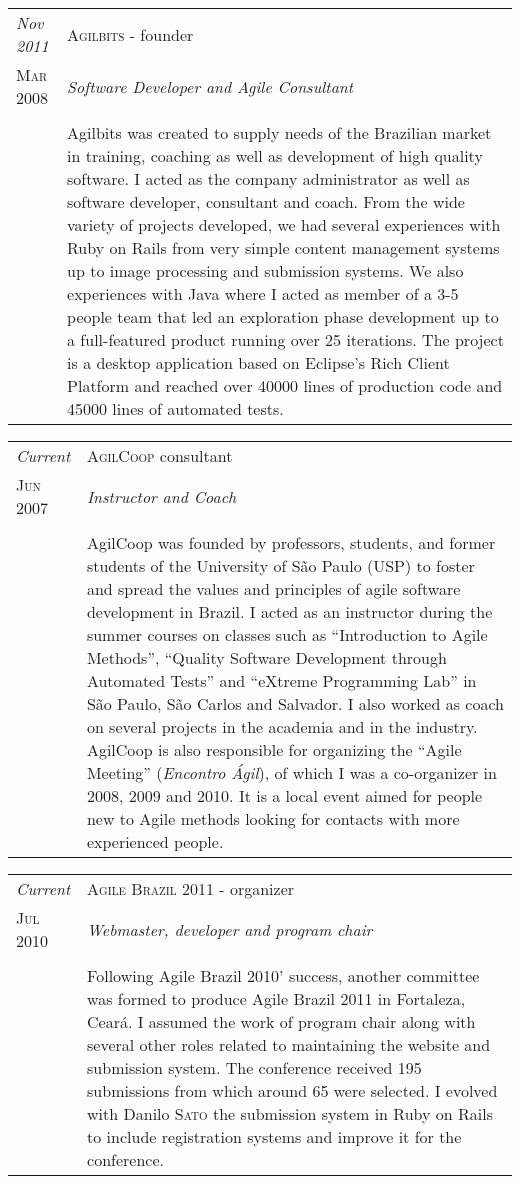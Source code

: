 \documentclass[letter,10pt]{article}
\begin{document}
\begin{tabular}{p{2.5cm}|p{13.5cm}}
  \emph{Nov 2011} & \textsc{Agilbits} - founder\\
  \textsc{Mar 2008}& \emph{Software Developer and Agile Consultant}\\
  &\\
  &Agilbits was created
  to supply needs of the Brazilian market in training, coaching as
  well as development of high quality software. I acted as the
  company administrator as well as software developer, consultant
  and coach.
  From the wide variety of projects developed, we had several
  experiences with Ruby on Rails from very simple content management
  systems up to image processing and submission systems.
  We also experiences with Java where I acted as member of a 3-5
  people team that led an exploration phase development up to a
  full-featured product running over 25 iterations. The project is a
  desktop application based on Eclipse's Rich Client Platform and
  reached over 40000 lines of production code and 45000 lines of
  automated tests.
\end{tabular}

\begin{tabular}{p{2.5cm}|p{13.5cm}}
  \emph{Current} & \textsc{AgilCoop} consultant\\
  \textsc{Jun 2007}& \emph{Instructor and Coach}\\
  &\\
  &AgilCoop was founded by professors,
  students, and former students of the University of São Paulo (USP)
  to foster and spread the values and principles of agile software
  development in Brazil. I acted as an instructor during the summer
  courses on classes such as ``Introduction to Agile Methods'',
  ``Quality Software Development through Automated Tests'' and
  ``eXtreme Programming Lab'' in São Paulo, São Carlos and Salvador.
  I also worked as coach on several projects in the academia
  and in the industry. AgilCoop is also responsible for organizing
  the ``Agile Meeting'' (\emph{Encontro Ágil}), of which I was a
  co-organizer in 2008, 2009 and 2010. It is a local
  event aimed for people new to Agile methods looking for contacts
  with more experienced people.
\end{tabular}

\begin{tabular}{p{2.5cm}|p{13.5cm}}
  \emph{Current} & \textsc{Agile Brazil 2011} - organizer\\
  \textsc{Jul 2010}& \emph{Webmaster, developer and program chair}\\
  &\\
  & Following Agile Brazil 2010' success, another committee was formed
  to produce Agile Brazil 2011 in Fortaleza, Ceará. I assumed the work
  of program chair along with several other roles related to
  maintaining the website and submission system. The conference
  received 195 submissions from which around 65 were selected. I
  evolved with Danilo \textsc{Sato} the submission system in Ruby on
  Rails to include registration systems and improve it for the conference.
\end{tabular}
\end{document}
